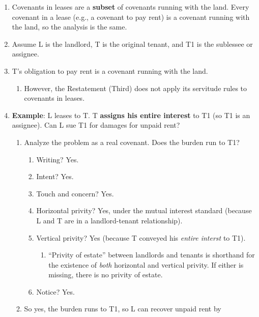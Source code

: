 \begin{enumerate}
    \item Covenants in leases are a \textbf{subset} of covenants running with 
    the land. Every covenant in a lease (e.g., a covenant to pay rent) is a 
    covenant running with the land, so the analysis is the same.
    \item Assume L is the landlord, T is the original tenant, and T1 is the 
    sublessee or assignee.
    \item T's obligation to pay rent is a covenant running with the land.
    \begin{enumerate}
        \item However, the Restatement (Third) does not apply its servitude 
        rules to covenants in leases.
    \end{enumerate}
    \item \textbf{Example}: L leases to T. T \textbf{assigns his entire 
    interest} to T1 (so T1 is an assignee). Can L sue T1 for damages for 
    unpaid rent?
    \begin{enumerate}
        \item Analyze the problem as a real covenant. Does the burden run to 
        T1?
        \begin{enumerate}
            \item Writing? Yes.
            \item Intent? Yes. %
            \item Touch and concern? Yes. %
            \item Horizontal privity? Yes, under the mutual interest standard 
            (because L and T are in a landlord-tenant relationship).
            \item Vertical privity? Yes (because T conveyed his \emph{entire 
            interst} to T1).
            \begin{enumerate}
                \item ``Privity of estate'' between landlords and tenants is 
                shorthand for the existence of \emph{both} horizontal and 
                vertical privity. If either is missing, there is no privity of 
                estate.
            \end{enumerate}
            \item Notice? Yes. %
        \end{enumerate}
        \item So yes, the burden runs to T1, so L can recover unpaid rent by 

\end{enumerate}
\end{enumerate}
